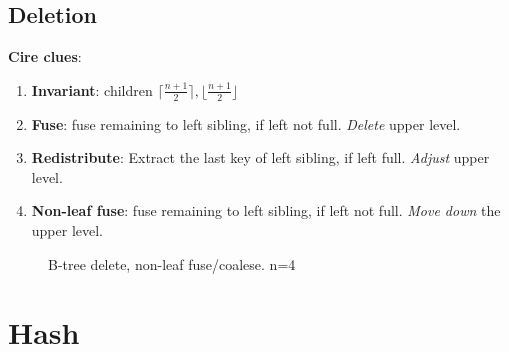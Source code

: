 \documentclass[a4paper]{report}
\begin{document}
\subsection{Deletion}
\textbf{Cire clues}:
\begin{enumerate}
\item \textbf{Invariant}: children $\lceil\frac{n+1}{2}\rceil, \lfloor\frac{n+1}{2}\rfloor$
\item \textbf{Fuse}: fuse remaining to left sibling, if left not full. \textit{Delete} upper level.
\item \textbf{Redistribute}: Extract the last key of left sibling, if left full. \textit{Adjust} upper level.
\item \textbf{Non-leaf fuse}: fuse remaining to left sibling, if left not full. \textit{Move down} the upper level.
\end{enumerate}
\begin{figure}[hbtp]
\centering
{}
\caption{B-tree delete, non-leaf fuse/coalese. n=4}
\label{fig:btreeDelete}
\end{figure}
\section{Hash}
\end{document}
